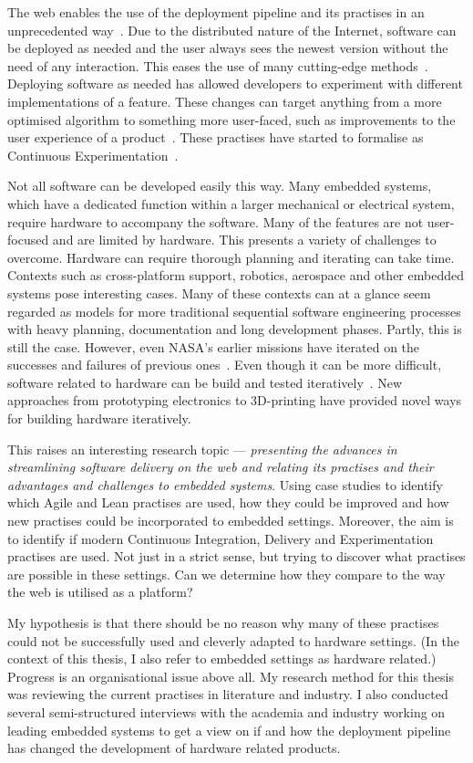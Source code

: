 \documentclass[english]{tktltiki2}
\begin{document}
The web enables the use of the deployment pipeline and its practises in an unprecedented way~\cite{KLS09}. Due to the distributed nature of the Internet, software can be deployed as needed and the user always sees the newest version without the need of any interaction. This eases the use of many cutting-edge methods~\cite{KLS09, FGM14}. Deploying software as needed has allowed developers to experiment with different implementations of a feature. These changes can target anything from a more optimised algorithm to something more user-faced, such as improvements to the user experience of a product~\cite{KLS09}. These practises have started to formalise as Continuous Experimentation~\cite{FGM14}.

Not all software can be developed easily this way. Many embedded systems, which have a dedicated function within a larger mechanical or electrical system, require hardware to accompany the software. Many of the features are not user-focused and are limited by hardware. This presents a variety of challenges to overcome. Hardware can require thorough planning and iterating can take time. Contexts such as cross-platform support, robotics, aerospace and other embedded systems pose interesting cases. Many of these contexts can at a glance seem regarded as models for more traditional sequential software engineering processes with heavy planning, documentation and long development phases. Partly, this is still the case. However, even NASA’s earlier missions have iterated on the successes and failures of previous ones~\cite{LB03}. Even though it can be more difficult, software related to hardware can be build and tested iteratively~\cite{LB03}. New approaches from prototyping electronics to 3D-printing have provided novel ways for building hardware iteratively.

This raises an interesting research topic — \emph{presenting the advances in streamlining software delivery on the web and relating its practises and their advantages and challenges to embedded systems}. Using case studies to identify which Agile and Lean practises are used, how they could be improved and how new practises could be incorporated to embedded settings. Moreover, the aim is to identify if modern Continuous Integration, Delivery and Experimentation practises are used. Not just in a strict sense, but trying to discover what practises are possible in these settings. Can we determine how they compare to the way the web is utilised as a platform?

My hypothesis is that there should be no reason why many of these practises could not be successfully used and cleverly adapted to hardware settings. (In the context of this thesis, I also refer to embedded settings as hardware related.) Progress is an organisational issue above all. My research method for this thesis was reviewing the current practises in literature and industry. I also conducted several semi-structured interviews with the academia and industry working on leading embedded systems to get a view on if and how the deployment pipeline has changed the development of hardware related products.
\end{document}
